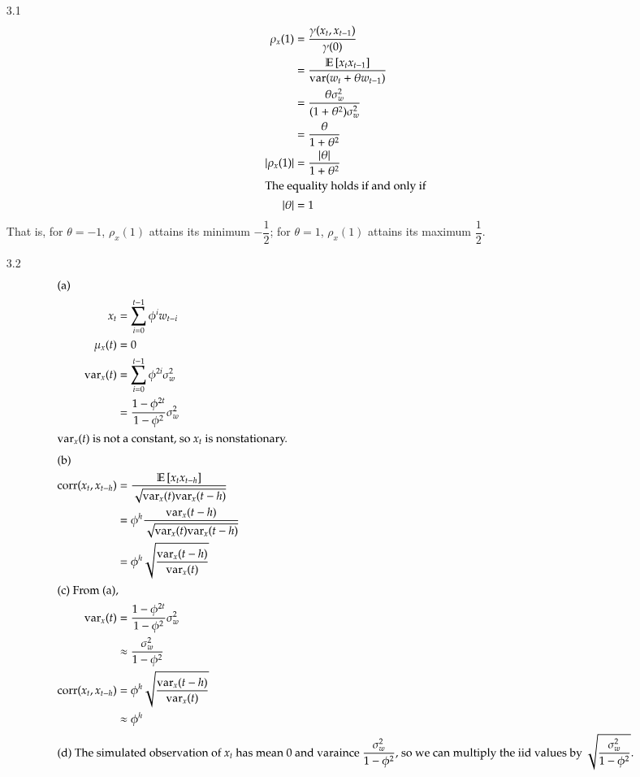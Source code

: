 \documentclass{article}
\newcommand{\ix}[1]{\intertext{{}#1}}
\newcommand{\var}{\mathrm{var}}
\newcommand{\corr}{\mathrm{corr}}
\newcommand{\mbe}[1]{\mathbb{E}\left[{}#1\right]}
\begin{document}
\begin{CJK*}{GBK}{song}
\begin{enumerate}
\section{Homework03}
\item[3.1]
\begin{align*}
    \rho _x(1)&=\dfrac{\gamma (x_t,x_{t-1})}{\gamma (0)}\\
    &= \dfrac{\mbe{x_tx_{t-1}}}{\mathrm{var}(w_t+\theta w_{t-1})}\\
    &= \dfrac{\theta \sigma_w^2}{(1+\theta^2)\sigma_w^2}\\
    &= \dfrac{\theta}{1+\theta^2}\\
    |\rho_x(1)|&= \dfrac{|\theta|}{1+\theta^2}\\
\ix{The equality holds if and only if}
    |\theta|&=1
\end{align*}
That is, for $\theta=-1$, $\rho_x(1)$ attains its minimum $-\dfrac{1}{2}$; for $\theta=1$, $\rho_x(1)$ attains its maximum $\dfrac{1}{2}$.
\begin{center}
\end{center}
\item[3.2]
\begin{align*}
\ix{(a)}
    x_t&=   \sum\limits_{i=0}^{t-1} \phi^iw_{t-i}\\
    \mu_x(t)&=0\\
    \var _x(t)&= \sum\limits_{i=0}^{t-1} \phi^{2i}\sigma_w^2\\
    &=\dfrac{1-\phi^{2t}}{1-\phi^2}\sigma_w^2\\
\ix{$\var _x(t)$ is not a constant, so $x_t$ is nonstationary.}
\ix{(b)}
    \corr (x_t,x_{t-h})&=\dfrac{\mbe{x_tx_{t-h}}}{\sqrt{\var_x(t)\var_x(t-h)}} \\
    &=\phi^h\dfrac{\var_x(t-h)}{\sqrt{\var_x(t)\var_x(t-h)}}  \\
    &= \phi^h\sqrt{\dfrac{\var_x(t-h)}{\var_x(t)}}\\
\ix{(c) From (a),}
    \var _x(t)&=\dfrac{1-\phi^{2t}}{1-\phi^2}\sigma_w^2\\
    &\approx \dfrac{\sigma_w^2}{1-\phi^2}\\
    \corr (x_t,x_{t-h})&=\phi^h\sqrt{\dfrac{\var_x(t-h)}{\var_x(t)}}\\
    &\approx \phi^h\\
\ix{(d) The simulated observation of $x_t$ has mean 0 and varaince $\dfrac{\sigma_w^2}{1-\phi^2}$, so we can multiply the iid values by $\sqrt{\dfrac{\sigma_w^2}{1-\phi^2}}$.}

\end{align*}
\end{enumerate}
\end{CJK*}
\end{document}
